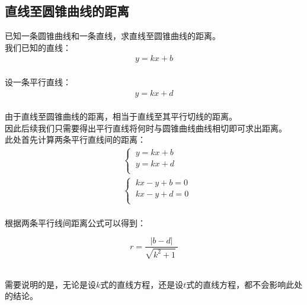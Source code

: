 \documentclass[UTF8]{ctexart}
\begin{document}
\subsection{直线至圆锥曲线的距离}
    已知一条圆锥曲线和一条直线，求直线至圆锥曲线的距离。\\[3mm]
    我们已知的直线：
    \setcounter{equation}{0}
    \begin{align}
        y=kx+b
    \end{align}\\
    设一条平行直线：
    \begin{align}
        y=kx+d
    \end{align}\\
    由于直线至圆锥曲线的距离，相当于直线至其平行切线的距离。\\[3mm]
    因此后续我们只需要得出平行直线将何时与圆锥曲线曲线相切即可求出距离。\\[6mm]
    此处首先计算两条平行直线间的距离：\vspace{5pt}
    \begin{align}
        &\begin{cases}
            ~y=kx+b\\[1mm]
            ~y=kx+d\\[1mm]
        \end{cases}\\[3mm]
        &\begin{cases}
            ~kx-y+b=0\\[1mm]
            ~kx-y+d=0\\[1mm]
        \end{cases}
    \end{align}\\[1mm]
    根据两条平行线间距离公式可以得到：
    \begin{large}
        \begin{equation*}
            r=\frac{|b-d|}{\sqrt{k^2+1}~}
        \end{equation*}
    \end{large}\\
    需要说明的是，无论是设$k$式的直线方程，还是设$t$式的直线方程，都不会影响此处的结论。


\newpage
\end{document}
